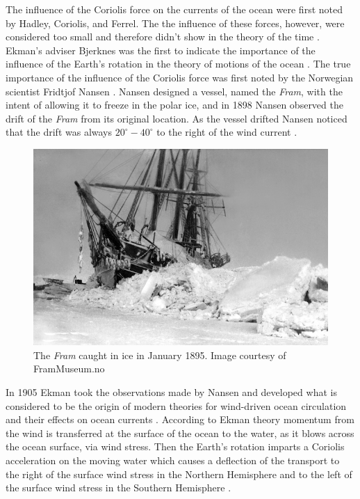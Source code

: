 The influence of the Coriolis force on the currents of the ocean were first
noted by Hadley, Coriolis, and Ferrel. The the influence of these forces,
however, were considered too small and therefore didn't show in the theory of
the time \cite{Ekman1905}. Ekman's adviser Bjerknes was the first to indicate
the importance of the influence of the Earth's rotation in the theory of motions
of the ocean \cite{Ekman1905}. The true importance of the influence of the
Coriolis force was first noted by the Norwegian scientist Fridtjof Nansen
\cite{Beesley2008, Ekman1905}. Nansen designed a vessel, named the \emph{Fram},
with the intent of allowing it to freeze in the polar ice, and in 1898 Nansen
observed the drift of the \emph{Fram} from its original location. As the vessel
drifted Nansen noticed that the drift was always $20^\circ - 40^\circ$ to the
right of the wind current \cite{Beesley2008}.

\begin{figure}
  \includegraphics[scale=0.35]{Figures/Fram.jpg}
  \caption{The \emph{Fram} caught in ice in January 1895. Image courtesy of
  FramMuseum.no}
  \label{fig:Fram}
\end{figure}
In 1905 Ekman \cite{Ekman1905} took the observations made by Nansen and developed
what is considered to be the origin of modern theories for wind-driven ocean
circulation and their effects on ocean currents \cite{Price1987}. According to
Ekman theory momentum from the wind is transferred at the surface of the ocean
to the water, as it blows across the ocean surface, via wind stress. Then the
Earth's rotation imparts a Coriolis acceleration on the moving water which
causes a deflection of the transport to the right of the surface wind stress in
the Northern Hemisphere and to the left of the surface wind stress in the
Southern Hemisphere \cite{Beesley2008}.


